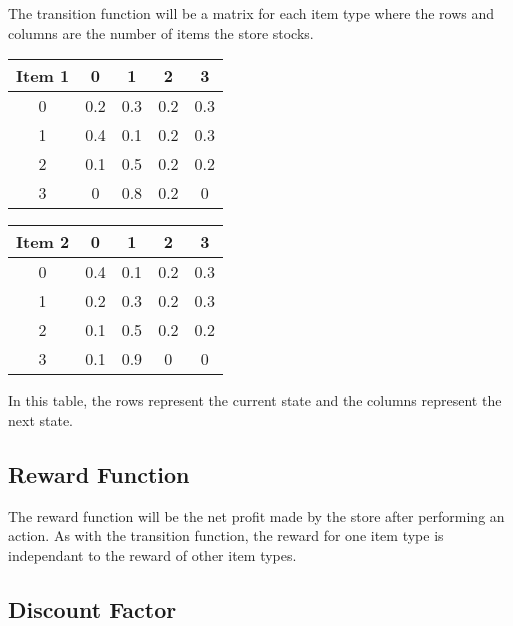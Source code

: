 \documentclass[12pt]{article}
\begin{document}
    The transition function will be a matrix for each item type where the rows and columns are the number of items the store stocks.

    \begin{center}
        \begin{tabular} {|c|c|c|c|c|}
            \hline
            Item 1 & 0 & 1 & 2 & 3 \\
            \hline
            0 & 0.2    & 0.3    & 0.2    & 0.3 \\
            1 & 0.4    & 0.1    & 0.2    & 0.3 \\
            2 & 0.1    & 0.5    & 0.2    & 0.2 \\
            3 & 0      & 0.8    & 0.2    & 0   \\
            \hline
        \end{tabular}
    \end{center}

    \begin{center}
        \begin{tabular} {|c|c|c|c|c|}
            \hline
            Item 2 & 0 & 1 & 2 & 3 \\
            \hline
            0 & 0.4    & 0.1    & 0.2    & 0.3 \\
            1 & 0.2    & 0.3    & 0.2    & 0.3 \\
            2 & 0.1    & 0.5    & 0.2    & 0.2 \\
            3 & 0.1    & 0.9  & 0    & 0       \\
            \hline
        \end{tabular}
    \end{center}

    In this table, the rows represent the current state and the columns represent the next state.

    \subsection{Reward Function}

    The reward function will be the net profit made by the store after performing an action. As with the transition function, the reward for one item type is independant to the reward of other item types.

    \subsection{Discount Factor}
\end{document}
